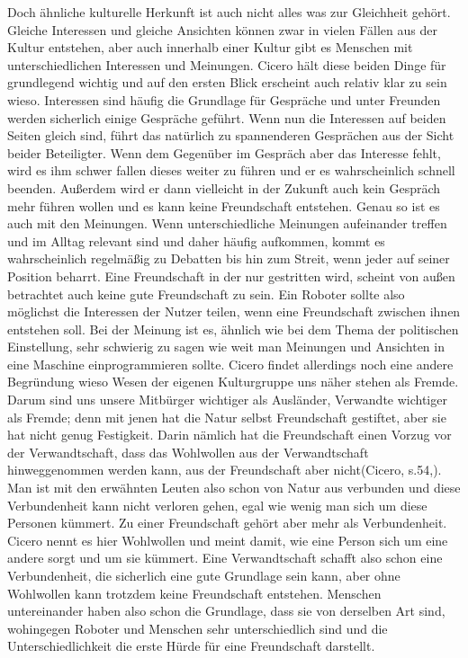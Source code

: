 \documentclass[12pt]{article}
\begin{document}
Doch ähnliche kulturelle Herkunft ist auch nicht alles was zur Gleichheit gehört. Gleiche Interessen und gleiche Ansichten können zwar in vielen Fällen aus der Kultur entstehen, aber auch innerhalb einer Kultur gibt es Menschen mit unterschiedlichen Interessen und Meinungen. Cicero hält diese beiden Dinge für grundlegend wichtig und auf den ersten Blick erscheint auch relativ klar zu sein wieso. Interessen sind häufig die Grundlage für Gespräche und unter Freunden werden sicherlich einige Gespräche geführt. Wenn nun die Interessen auf beiden Seiten gleich sind, führt das natürlich zu spannenderen Gesprächen aus der Sicht beider Beteiligter. Wenn dem Gegenüber im Gespräch aber das Interesse fehlt, wird es ihm schwer fallen dieses weiter zu führen und er es wahrscheinlich schnell beenden. Außerdem wird er dann vielleicht in der Zukunft auch kein Gespräch mehr führen wollen und es kann keine Freundschaft entstehen. Genau so ist es auch mit den Meinungen. Wenn unterschiedliche Meinungen aufeinander treffen und im Alltag relevant sind und daher häufig aufkommen, kommt es wahrscheinlich regelmäßig zu Debatten bis hin zum Streit, wenn jeder auf seiner Position beharrt. Eine Freundschaft in der nur gestritten wird, scheint von außen betrachtet auch keine gute Freundschaft zu sein.\newline
Ein Roboter sollte also möglichst die Interessen der Nutzer teilen, wenn eine Freundschaft zwischen ihnen entstehen soll. Bei der Meinung ist es, ähnlich wie bei dem Thema der politischen Einstellung, sehr schwierig zu sagen wie weit man Meinungen und Ansichten in eine Maschine einprogrammieren sollte.\newline
Cicero findet allerdings noch eine andere Begründung wieso Wesen der eigenen Kulturgruppe uns näher stehen als Fremde. \glqq Darum sind uns unsere Mitbürger wichtiger als Ausländer, Verwandte wichtiger als Fremde; denn mit jenen hat die Natur selbst Freundschaft gestiftet, aber sie hat nicht genug Festigkeit. Darin nämlich hat die Freundschaft einen Vorzug vor der Verwandtschaft, dass das Wohlwollen aus der Verwandtschaft hinweggenommen werden kann, aus der Freundschaft aber nicht\grqq(Cicero, s.54,). Man ist mit den erwähnten Leuten also schon von Natur aus verbunden und diese Verbundenheit kann nicht verloren gehen, egal wie wenig man sich um diese Personen kümmert. Zu einer Freundschaft gehört aber mehr als Verbundenheit. Cicero nennt es hier Wohlwollen und meint damit, wie eine Person sich um eine andere sorgt und um sie kümmert. Eine Verwandtschaft schafft also schon eine Verbundenheit, die sicherlich eine gute Grundlage sein kann, aber ohne Wohlwollen kann trotzdem keine Freundschaft entstehen. Menschen untereinander haben also schon die Grundlage, dass sie von derselben Art sind, wohingegen Roboter und Menschen sehr unterschiedlich sind und die Unterschiedlichkeit die erste Hürde für eine Freundschaft darstellt.
\end{document}

